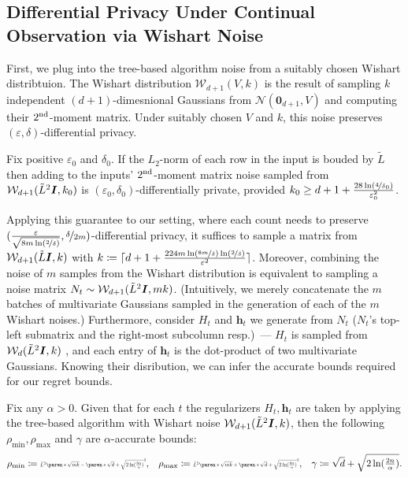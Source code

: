 \documentclass{article}
\renewcommand{\vec}[1]{\bm{#1}}
\newcommand{\defeq}{\coloneq}
\DeclarePairedDelimiter{\paren}()
\newcommand{\Wishart}{\mathcal{W}}
\newcommand{\Normal}{\mathcal{N}}
\newcommand{\Eye}[1][]{\bm{I}\notblank{#1}{_{{#1}\times{#1}}}{}}
\begin{document}
\subsection{Differential Privacy Under Continual Observation via Wishart Noise}
\label{sec:dp-wishart}

First, we plug into the tree-based algorithm noise from a suitably chosen Wishart distribtuion. The Wishart distribution $\Wishart_{d+1}(V, k)$ is the result of sampling $k$ independent  $(d+1)$-dimesnional Gaussians from $\Normal(\vec 0_{d+1}, V)$ and computing their $2^{\rm nd}$-moment matrix. Under suitably chosen $V$ and $k$, this noise preserves $(\varepsilon,\delta)$-differential privacy.

\begin{theorem}
  \label{thm:wishart-cont-dp}
  Fix positive $\varepsilon_0$ and $\delta_0$. If the $L_2$-norm of each row in the input is bouded by $\tilde L$ then adding to the inputs' $2^{\rm nd}$-moment matrix noise sampled from $\Wishart_{d+1}(\tilde L^2 \Eye, k_0)$ is $(\varepsilon_0,\delta_0)$-differentially private, provided $k_0\geq d+1 + \tfrac{28\ln(\nicefrac 4 \delta_0)}{\varepsilon_0^2}$.
  \end{theorem}
Applying this guarantee to our setting, where each count needs to preserve $(\tfrac{\varepsilon}{\sqrt{8m\ln(\nicefrac{2}{\delta})}}, \nicefrac{\delta}{2m})$-differential privacy, it suffices to sample a matrix from $\Wishart_{d+1}(\tilde{L} \Eye, k)$ with $k \defeq \lceil d+1 + \tfrac{224m\ln(\nicefrac {8m} \delta)\ln(\nicefrac 2 \delta)}{\varepsilon^2}   \rceil$. Moreover, combining the noise of $m$ samples from the Wishart distribution is equivalent to sampling a noise matrix $N_t\sim \Wishart_{d+1}(\tilde L^2\Eye, mk)$. (Intuitively, we merely concatenate the $m$ batches of multivariate Gaussians sampled in the generation of each of the $m$ Wishart noises.) Furthermore, consider $H_t$ and $\vec h_t$ we generate from $N_t$ ($N_t$'s top-left submatrix and the right-most subcolumn resp.)~--- $H_t$ is sampled from $\Wishart_d(\tilde L^2\Eye,k)$ , and each entry of $\vec h_t$ is the dot-product of two multivariate Gaussians. Knowing their disribution, we can infer the accurate bounds required for our regret bounds.
\begin{proposition}
\label{pro:accurate_bounds_for_Wishart}
Fix any $\alpha>0$. Given that for each $t$ the regularizers $H_t, \vec h_t$ are taken by applying the tree-based algorithm with Wishart noise $\Wishart_{d+1}(\tilde L^2 \Eye, k)$, then the following $\rho_{\min},\rho_{\max}$ and $\gamma$ are $\alpha$-accurate bounds:
\begin{align*}
    \rho_{\min}\defeq  \resizebox{11em}{!}{$\tilde L^2 \paren*{\sqrt{mk}
                             - \paren*{\sqrt{d} + \sqrt{2\ln(\tfrac{8n}{\alpha})}}}^2$},
    &&\rho_{\max}\defeq \resizebox{11em}{!}{$\tilde L^2 \paren*{\sqrt{mk}
                             + \paren*{\sqrt{d} + \sqrt{2\ln(\tfrac{8n}{\alpha})}}}^2$},
    &&\gamma \defeq \sqrt{d} + \sqrt{2\ln(\tfrac{2n}{\alpha})}.
  \end{align*}
\end{proposition}
\end{document}
